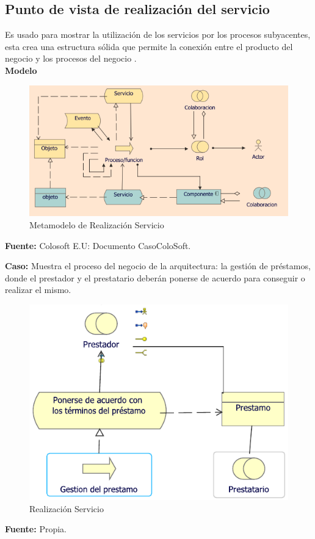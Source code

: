 	\subsection{Punto de vista de realización del servicio}
	{Es usado para mostrar la utilización de los servicios por los procesos subyacentes, esta crea una estructura sólida que permite la conexión entre el producto del negocio y los procesos del negocio \cite{archimate}.\\
		
		\textbf{Modelo}\\
		\begin{figure}[H]
			\centering
			\includegraphics[width=0.8\linewidth]{development/realizacionser.png}
			\caption{Metamodelo de Realización Servicio}
		\end{figure}
		\begin{center}
			\textbf{Fuente:} Colosoft E.U: Documento CasoColoSoft.
		\end{center}
		\hfill \break
		
		\textbf{Caso:} Muestra el proceso del negocio de la arquitectura: la gestión de préstamos, donde el prestador y el prestatario deberán ponerse de acuerdo para conseguir o realizar el mismo.
			
		
		\begin{figure}[H]
			\centering
			\includegraphics[width=0.8\linewidth]{development/realizacionser.pdf}
			\caption{Realización Servicio}
		\end{figure}
		\begin{center}
			\textbf{Fuente:} Propia.
		\end{center}
	}
	
